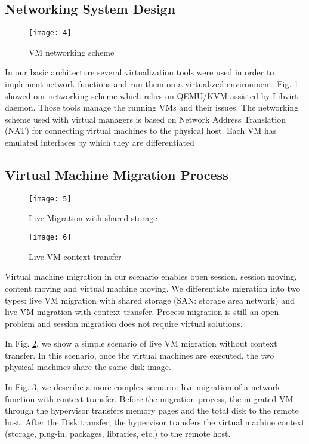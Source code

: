 \documentclass[letterpaper,conference]{IEEEtran}
\begin{document}
\subsection{Networking System Design}

\begin{figure}[t]
\centering
\texttt{[image: 4]}
\caption{VM networking scheme}
\label{4}
\end{figure}

In our basic architecture several virtualization tools were used in order to implement network functions and run them on a virtualized environment. Fig. \ref{4} showed our networking scheme which relies on QEMU/KVM assisted by Libvirt daemon. Those tools manage the running VMs and their issues. The networking scheme used with virtual managers is based on Network Address Translation (NAT) for connecting virtual machines to the physical host. Each VM has emulated interfaces by which they are differentiated

\subsection{Virtual Machine Migration Process}

\begin{figure}[t]
\centering
\texttt{[image: 5]}
\caption{Live Migration with shared storage}
\label{5}
\end{figure}

\begin{figure}[t]
\centering
\texttt{[image: 6]}
\caption{Live VM context transfer}
\label{6}
\end{figure}

Virtual machine migration in our scenario enables open session, session moving, content moving and virtual machine moving. We differentiate migration into two types: live VM
migration with shared storage (SAN: storage area network)
and live VM migration with context transfer. Process
migration is still an open problem and session migration does not require virtual solutions.

In Fig. \ref{5}, we show a simple scenario of live VM
migration without context transfer. In this scenario, once the virtual machines are executed, the two physical machines share the same disk image.

In Fig. \ref{6}, we describe a more complex scenario: live migration of a network function with context transfer. Before the migration process, the migrated VM through the hypervisor transfers memory pages and the total disk to the remote host. After the Disk transfer, the hypervisor transfers the virtual machine context (storage, plug-in, packages, libraries, etc.) to the remote host.
\end{document}
